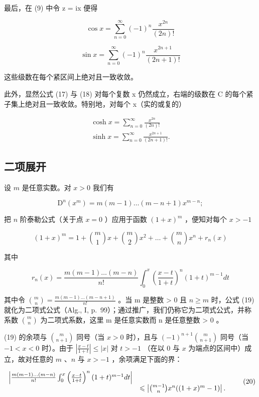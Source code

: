 最后，在 (9) 中令 z = ix 便得

\[
\cos x = \sum_ {n = 0} ^ {\infty} (- 1) ^ {n} \frac {x ^ {2 n}}{(2 n) !}\tag{17}
\]

\[
\sin x = \sum_ {n = 0} ^ {\infty} (- 1) ^ {n} \frac {x ^ {2 n + 1}}{(2 n + 1) !}\tag{18}
\]

这些级数在每个紧区间上绝对且一致收敛。

此外，显然公式 (17) 与 (18) 对每个复数 x 仍然成立，右端的级数在 C 的每个紧子集上绝对且一致收敛。特别地，对每个 x（实的或复的）

\[
\begin{array}{l} \cosh x = \sum_ {n = 0} ^ {\infty} \frac {x ^ {2 n}}{(2 n) !} \\ \sinh x = \sum_ {n = 0} ^ {\infty} \frac {x ^ {2 n + 1}}{(2 n + 1) !}. \end{array}
\]

\subsection{二项展开}

设 \(m\) 是任意实数。对 \(x > 0\) 我们有

\[
\mathrm{D} ^ {n} (x ^ {m}) = m (m - 1) \dots (m - n + 1) x ^ {m - n};
\]

把 \(n\) 阶泰勒公式（关于点 \(x = 0\) ）应用于函数 \((1 + x)^m\) ，便知对每个 \(x > -1\)

\[
(1 + x) ^ {m} = 1 + \binom {m} {1} x + \binom {m} {2} x ^ {2} + \dots + \binom {m} {n} x ^ {n} + r _ {n} (x)\tag{19}
\]

其中

\[
r _ {n} (x) = \frac {m (m - 1) \dots (m - n)}{n !} \int_ {0} ^ {x} \left(\frac {x - t}{1 + t}\right) ^ {n} (1 + t) ^ {m - 1} d t
\]

其中令 \(\binom{m}{n} = \frac{m(m-1)\ldots(m-n+1)}{n!}\) 。当 m 是整数 \textgreater{} 0 且 \(n \geqslant m\) 时，公式 (19) 就化为二项式公式（Alg., I, p.~99）；通过推广，我们仍称它为二项式公式，并称系数 \(\binom{m}{n}\) 为二项式系数，这里 m 是任意实数而 n 是任意整数 \textgreater{} 0 。

(19) 的余项与 \(\binom{m}{n+1}\) 同号（当 \(x > 0\) 时），且与 \((-1)^{n+1}\binom{m}{n+1}\) 同号（当 \(-1 < x < 0\) 时）。由于 \(\left|\frac{x-t}{1+t}\right| \leqslant |x|\) 对 \(t > -1\) （在以 0 与 \(x\) 为端点的区间中）成立，故对任意的 \(m\) 、\(n\) 与 \(x > -1\) ，余项满足下面的界：

\[
\begin{array}{r l} \left| \frac {m (m - 1) \dots (m - n)}{n !} \int_ {0} ^ {x} \left(\frac {x - t}{1 + t}\right) ^ {n} (1 + t) ^ {m - 1} d t \right| & \\ & \leqslant \left| \binom {m - 1} {n} x ^ {n} ((1 + x) ^ {m} - 1) \right|. \end{array}\tag{20}
\]

